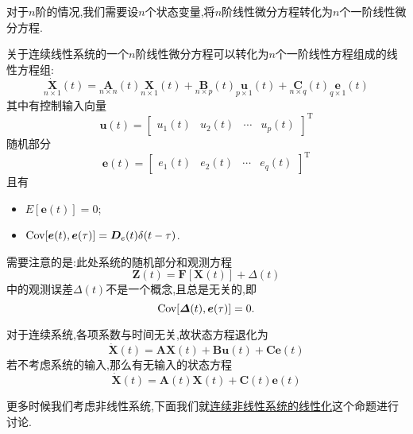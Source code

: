 \documentclass[cn,10pt,citestyle=gb7714-2015,bibstyle=gb7714-2015]{elegantbook}
\newcommand{\mT}{\mathrm{T}}
\newcommand{\Cov}{\textup{Cov}}
\begin{document}
对于$n$阶的情况,我们需要设$n$个状态变量,将$n$阶线性微分方程转化为$n$个一阶线性微分方程.
\begin{proposition}[连续线性系统的微分方程组]\label{pro:continuous-linear-system-ODE}
  关于连续线性系统的一个$n$阶线性微分方程可以转化为$n$个一阶线性方程组成的线性方程组:
  \begin{equation}\label{eq:continuous-linear-system-ODE}
    \underset{n\times 1}{\dot{\bm{X}}}(t)=\underset{n\times n}{\bm{A}}(t)\underset{n\times 1}{\bm{X}}(t)+\underset{n\times p}{\bm{B}}(t)\underset{p\times 1}{\bm{u}}(t)+\underset{n\times q}{\bm{C}}(t)\underset{q\times 1}{\bm{e}}(t)
  \end{equation}
  其中有控制输入向量
  \[
      \bm{u}(t)=\begin{bmatrix}
        u_1(t)&u_2(t)&\cdots&u_p(t)
      \end{bmatrix}^\mT
  \]
  随机部分
  \[
      \bm{e}(t)=\begin{bmatrix}
        e_1(t)&e_2(t)&\cdots&e_q(t)
      \end{bmatrix}^\mT
  \]
  且有
  \begin{itemize}
    \item $E[\bm{e}(t)]=0$;
    \item $\Cov[\bm{e}(t),\bm{e}(\tau)]=\bm{D}_e(t)\delta(t-\tau)$.
  \end{itemize}
\end{proposition}
\begin{note}
    需要注意的是:此处系统的随机部分和观测方程
    \[
        \bm{Z}(t)=\bm{F}[\bm{X}(t)]+\bm{\varDelta}(t)
    \]
    中的观测误差$\bm{\varDelta}(t)$不是一个概念,且总是无关的,即
    \begin{equation}
      \Cov[\bm{\varDelta}(t),\bm{e}(\tau)]=0.
    \end{equation}
  \end{note}
对于连续系统,各项系数与时间无关,故状态方程退化为
\begin{equation}
  \dot{\bm{X}}(t)=\bm{A}\bm{X}(t)+\bm{B}\bm{u}(t)+\bm{C}\bm{e}(t)
\end{equation}
若不考虑系统的输入,那么有无输入的状态方程
\begin{equation}
  \dot{\bm{X}}(t)=\bm{A}(t)\bm{X}(t)+\bm{C}(t)\bm{e}(t)
\end{equation}

更多时候我们考虑非线性系统,下面我们就\uline{连续非线性系统的线性化}这个命题进行讨论.
\end{document}
